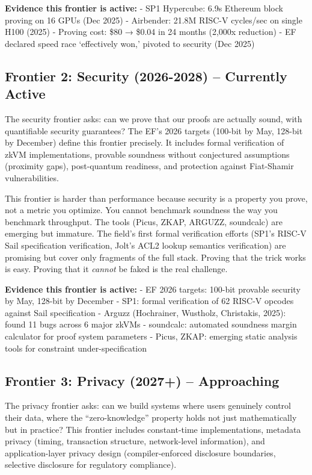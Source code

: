 \documentclass[
  11pt,
  openany]{report}
\renewcommand{\textbf}[1]{{\bfseries\color{MidnightBold}#1}}
\begin{document}
\textbf{Evidence this frontier is active:} - SP1 Hypercube: 6.9s Ethereum block
proving on 16 GPUs (Dec 2025) - Airbender: 21.8M RISC-V cycles/sec on single
H100 (2025) - Proving cost: \$80 → \$0.04 in 24 months (2,000x reduction) - EF
declared speed race `effectively won,' pivoted to security (Dec 2025)

\subsection{Frontier 2: Security (2026-2028) -- Currently
Active}\label{frontier-2-security-2026-2028-currently-active}

The security frontier asks: can we prove that our proofs are actually sound,
with quantifiable security guarantees? The EF's 2026 targets (100-bit by May,
128-bit by December) define this frontier precisely. It includes formal
verification of zkVM implementations, provable soundness without conjectured
assumptions (proximity gaps), post-quantum readiness, and protection against
Fiat-Shamir vulnerabilities.

This frontier is harder than performance because security is a property you
prove, not a metric you optimize. You cannot benchmark soundness the way you
benchmark throughput. The tools (Picus, ZKAP, ARGUZZ, soundcalc) are emerging
but immature. The field's first formal verification efforts (SP1's RISC-V Sail
specification verification, Jolt's ACL2 lookup semantics verification) are
promising but cover only fragments of the full stack. Proving that the trick
works is easy. Proving that it \emph{cannot} be faked is the real challenge.

\textbf{Evidence this frontier is active:} - EF 2026 targets: 100-bit provable
security by May, 128-bit by December - SP1: formal verification of 62 RISC-V
opcodes against Sail specification - Arguzz (Hochrainer, Wustholz, Christakis,
2025): found 11 bugs across 6 major zkVMs - soundcalc: automated soundness
margin calculator for proof system parameters - Picus, ZKAP: emerging static
analysis tools for constraint under-specification

\subsection{Frontier 3: Privacy (2027+) --
Approaching}\label{frontier-3-privacy-2027-approaching}

The privacy frontier asks: can we build systems where users genuinely control
their data, where the ``zero-knowledge'' property holds not just mathematically
but in practice? This frontier includes constant-time implementations, metadata
privacy (timing, transaction structure, network-level information), and
application-layer privacy design (compiler-enforced disclosure boundaries,
selective disclosure for regulatory compliance).
\end{document}
